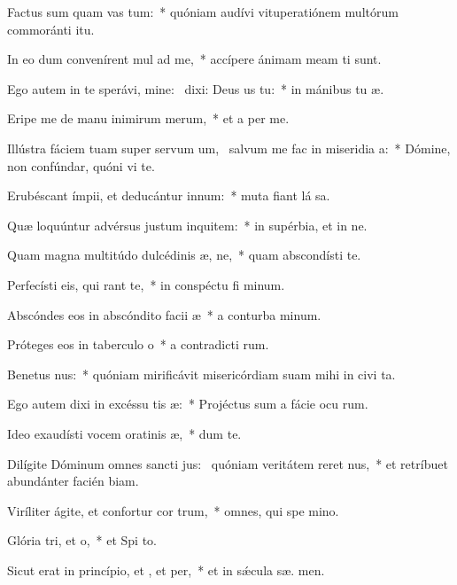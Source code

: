\item Factus sum quam vas tum:~* quóniam audívi vituperatiónem multórum commoránti  itu.
\item In eo dum convenírent mul ad me,~* accípere ánimam meam ti sunt.
\item Ego autem in te sperávi, mine:~\pscross{} dixi: Deus us  tu:~* in mánibus tu  æ.
\item Eripe me de manu inimirum merum,~* et a per me.
\item Illústra fáciem tuam super servum um,~\pscross{} salvum me fac in miseridia a:~* Dómine, non confúndar, quóni vi te.
\item Erubéscant ímpii, et deducántur  innum:~* muta fiant lá sa.
\item Quæ loquúntur advérsus justum inquitem:~* in supérbia, et in ne.
\item Quam magna multitúdo dulcédinis æ, ne,~* quam abscondísti  te.
\item Perfecísti eis, qui rant  te,~* in conspéctu fi minum.
\item Abscóndes eos in abscóndito facii æ~* a conturba minum.
\item Próteges eos in taberculo o~* a contradicti rum.
\item Benetus nus:~* quóniam mirificávit misericórdiam suam mihi in civi ta.
\item Ego autem dixi in excéssu tis æ:~* Projéctus sum a fácie ocu rum.
\item Ideo exaudísti vocem oratinis æ,~* dum   te.
\item Dilígite Dóminum omnes sancti jus:~\pscross{} quóniam veritátem reret nus,~* et retríbuet abundánter facién biam.
\item Viríliter ágite, et confortur cor trum,~* omnes, qui spe  mino.
\item Glória tri, et o,~* et Spi to.
\item Sicut erat in princípio, et , et per,~* et in sǽcula sæ. men.
